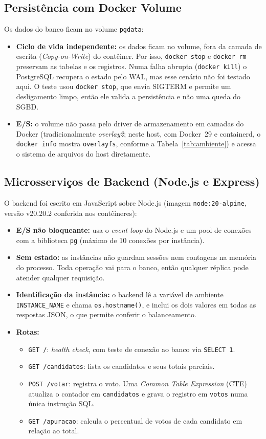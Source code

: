 \documentclass[12pt,a4paper]{article}
\begin{document}
\subsection{Persistência com Docker Volume}
Os dados do banco ficam no volume \texttt{pgdata}:
\begin{itemize}
    \item \textbf{Ciclo de vida independente:} os dados ficam no volume, fora da camada de escrita (\textit{Copy-on-Write}) do contêiner. Por isso, \texttt{docker stop} e \texttt{docker rm} preservam as tabelas e os registros. Numa falha abrupta (\texttt{docker kill}) o PostgreSQL recupera o estado pelo WAL, mas esse cenário não foi testado aqui. O teste usou \texttt{docker stop}, que envia SIGTERM e permite um desligamento limpo, então ele valida a persistência e não uma queda do SGBD.
    \item \textbf{E/S:} o volume não passa pelo driver de armazenamento em camadas do Docker (tradicionalmente \textit{overlay2}; neste host, com Docker~29 e containerd, o \texttt{docker info} mostra \texttt{overlayfs}, conforme a Tabela~\ref{tab:ambiente}) e acessa o sistema de arquivos do host diretamente.
\end{itemize}

\subsection{Microsserviços de Backend (Node.js e Express)}
O backend foi escrito em JavaScript sobre Node.js (imagem \texttt{node:20-alpine}, versão v20.20.2 conferida nos contêineres):
\begin{itemize}
    \item \textbf{E/S não bloqueante:} usa o \textit{event loop} do Node.js e um pool de conexões com a biblioteca \texttt{pg} (máximo de 10 conexões por instância).
    \item \textbf{Sem estado:} as instâncias não guardam sessões nem contagens na memória do processo. Toda operação vai para o banco, então qualquer réplica pode atender qualquer requisição.
    \item \textbf{Identificação da instância:} o backend lê a variável de ambiente \texttt{INSTANCE\_NAME} e chama \texttt{os.hostname()}, e inclui os dois valores em todas as respostas JSON, o que permite conferir o balanceamento.
    \item \textbf{Rotas:}
    \begin{itemize}
        \item \texttt{GET /}: \textit{health check}, com teste de conexão ao banco via \texttt{SELECT 1}.
        \item \texttt{GET /candidatos}: lista os candidatos e seus totais parciais.
        \item \texttt{POST /votar}: registra o voto. Uma \textit{Common Table Expression} (CTE) atualiza o contador em \texttt{candidatos} e grava o registro em \texttt{votos} numa única instrução SQL.
        \item \texttt{GET /apuracao}: calcula o percentual de votos de cada candidato em relação ao total.
    \end{itemize}
\end{itemize}
\end{document}
